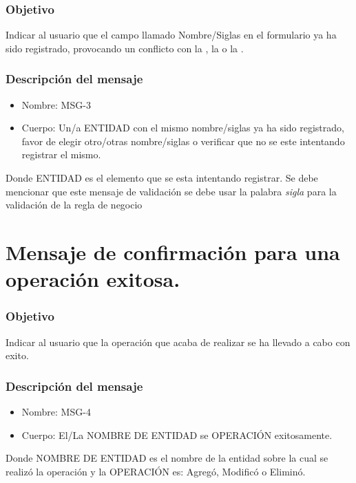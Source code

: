 \subsubsection{Objetivo}
Indicar al usuario que el campo llamado Nombre/Siglas en el formulario ya ha sido registrado, provocando un conflicto con la , la  o la .

\subsubsection{Descripción del mensaje}
\begin{itemize}
\item Nombre: MSG-3
\item Cuerpo: Un/a ENTIDAD con el mismo nombre/siglas ya ha sido registrado, favor de elegir otro/otras nombre/siglas o verificar que no se este intentando registrar el mismo.

\end{itemize}
Donde ENTIDAD es el elemento que se esta intentando registrar. Se debe mencionar que este mensaje de validación se debe usar la palabra \textit{sigla} para la validación de la regla de negocio  


\section{Mensaje de confirmación para una operación exitosa.}\label{MSG4}

\subsubsection{Objetivo}
Indicar al usuario que la operación que acaba de realizar se ha llevado a cabo con exito.

\subsubsection{Descripción del mensaje}
\begin{itemize}
\item Nombre: MSG-4
\item Cuerpo: El/La NOMBRE DE ENTIDAD se OPERACIÓN exitosamente. 
\end{itemize}
Donde NOMBRE DE ENTIDAD es el nombre de la entidad sobre la cual se realizó la operación y la OPERACIÓN es: Agregó, Modificó o Eliminó.


